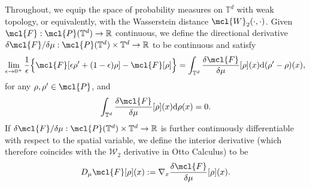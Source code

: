 Throughout, we equip the space of probability measures on $\mathbb{T}^d$ with weak topology, or equivalently, with the Wasserstein distance $\mcl{W}_2(\cdot,\cdot)$. Given $\mcl{F}: \mcl{P}(\mathbb{T}^d) \to \mathbb{R}$ continuous, we define the directional derivative $\delta \mcl{F}/\delta \mu: \mcl{P}(\mathbb{T}^d) \times \mathbb{T}^d \to \mathbb{R}$ to be continuous and satisfy 
\begin{align*}
    \lim_{\epsilon \to 0^+} \frac{1}{\epsilon} \Big\{\mcl{F}[\epsilon \rho' + (1 - \epsilon)\rho ] - \mcl{F}[\rho]\Big\}= \int_{\mathbb{T}^d} \frac{\delta \mcl{F}}{\delta \mu}[\rho](x)  \mathrm{d}(\rho' - \rho)(x),
 \end{align*}
for any $\rho, \rho' \in \mcl{P}$, and
\begin{align*}
\int_{\mathbb{T}^d}  \frac{\delta \mcl{F}}{\delta \mu}[\rho](x)\mathrm{d}\rho(x) = 0.
\end{align*} 
If $\delta \mcl{F} / \delta \mu : \mcl{P}(\mathbb{T}^d) \times \mathbb{T}^d \to \mathbb{R}$ is further continuously differentiable with respect to the spatial variable, we define the interior derivative (which therefore coincides with the $\mathcal{W}_2$ derivative in Otto Calculus) to be 
\begin{align*}
D_{\mu} \mcl{F}[\rho](x) := \nabla_x \frac{\delta \mcl{F}}{\delta \mu}[\rho](x).
\end{align*}

